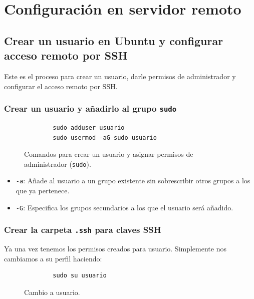 \chapter{Configuración en servidor remoto}

\section{Crear un usuario en Ubuntu y configurar acceso remoto por SSH}

Este es el proceso para crear un usuario, darle permisos de administrador y configurar el acceso remoto por SSH.

\subsection{Crear un usuario y añadirlo al grupo \texttt{sudo}}

\begin{figure}[h!]
    \centering
    \begin{verbatim}
        sudo adduser usuario
        sudo usermod -aG sudo usuario
    \end{verbatim}
    \caption{Comandos para crear un usuario y asignar permisos de administrador (\texttt{sudo}).}
    \label{fig:adduser-sudo}
\end{figure}

\begin{itemize}
    \item \texttt{-a}: Añade al usuario a un grupo existente sin sobrescribir otros grupos a los que ya pertenece.
    \item \texttt{-G}: Especifica los grupos secundarios a los que el usuario será añadido.
\end{itemize}

\subsection{Crear la carpeta \texttt{.ssh} para claves SSH}

Ya una vez tenemos los permisos creados para usuario. Simplemente nos cambiamos a su perfil haciendo:

\begin{figure}[h!]
    \centering
    \begin{verbatim}
        sudo su usuario
    \end{verbatim}
    \caption{Cambio a usuario.}
    \label{fig:adduser-sudo}
\end{figure}

